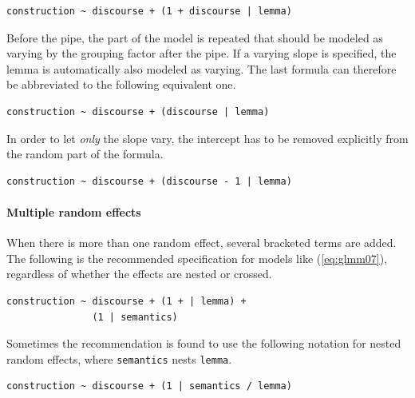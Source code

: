 \documentclass[a4paper,12pt]{article}
\begin{document}
\begin{lstlisting}
construction ~ discourse + (1 + discourse | lemma)
\end{lstlisting}

Before the pipe, the part of the model is repeated that should be modeled as varying by the grouping factor after the pipe.
If a varying slope is specified, the lemma is automatically also modeled as varying. 
The last formula can therefore be abbreviated to the following equivalent one.

\vspace{0.5\baselineskip}

\begin{lstlisting}
construction ~ discourse + (discourse | lemma)
\end{lstlisting}

In order to let \textit{only} the slope vary, the intercept has to be removed explicitly from the random part of the formula.

\vspace{0.5\baselineskip}

\begin{lstlisting}
construction ~ discourse + (discourse - 1 | lemma)
\end{lstlisting}

\paragraph{Multiple random effects}

When there is more than one random effect, several bracketed terms are added.
The following is the recommended specification for models like (\ref{eq:glmm07}), regardless of whether the effects are nested or crossed.

\vspace{0.5\baselineskip}

\begin{lstlisting}
construction ~ discourse + (1 + | lemma) +
               (1 | semantics)
\end{lstlisting}

Sometimes the recommendation is found to use the following notation for nested random effects, where \texttt{semantics} nests \texttt{lemma}.

\vspace{0.5\baselineskip}

\begin{lstlisting}
construction ~ discourse + (1 | semantics / lemma)
\end{lstlisting}
\end{document}
